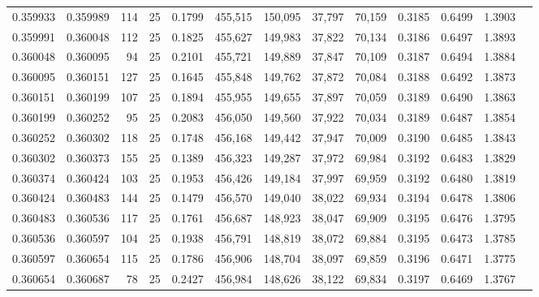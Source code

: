 \begin{tabular}{rrrrrrrrrrrrr}
0.359933 & 0.359989 &   114 &  25 &                                     0.1799 & 455,515 & 150,095 &  37,797 &  70,159 & 0.3185 & 0.6499 & 1.3903 \\
0.359991 & 0.360048 &   112 &  25 &                                     0.1825 & 455,627 & 149,983 &  37,822 &  70,134 & 0.3186 & 0.6497 & 1.3893 \\
0.360048 & 0.360095 &    94 &  25 &                                     0.2101 & 455,721 & 149,889 &  37,847 &  70,109 & 0.3187 & 0.6494 & 1.3884 \\
0.360095 & 0.360151 &   127 &  25 &                                     0.1645 & 455,848 & 149,762 &  37,872 &  70,084 & 0.3188 & 0.6492 & 1.3873 \\
0.360151 & 0.360199 &   107 &  25 &                                     0.1894 & 455,955 & 149,655 &  37,897 &  70,059 & 0.3189 & 0.6490 & 1.3863 \\
0.360199 & 0.360252 &    95 &  25 &                                     0.2083 & 456,050 & 149,560 &  37,922 &  70,034 & 0.3189 & 0.6487 & 1.3854 \\
0.360252 & 0.360302 &   118 &  25 &                                     0.1748 & 456,168 & 149,442 &  37,947 &  70,009 & 0.3190 & 0.6485 & 1.3843 \\
0.360302 & 0.360373 &   155 &  25 &                                     0.1389 & 456,323 & 149,287 &  37,972 &  69,984 & 0.3192 & 0.6483 & 1.3829 \\
0.360374 & 0.360424 &   103 &  25 &                                     0.1953 & 456,426 & 149,184 &  37,997 &  69,959 & 0.3192 & 0.6480 & 1.3819 \\
0.360424 & 0.360483 &   144 &  25 &                                     0.1479 & 456,570 & 149,040 &  38,022 &  69,934 & 0.3194 & 0.6478 & 1.3806 \\
0.360483 & 0.360536 &   117 &  25 &                                     0.1761 & 456,687 & 148,923 &  38,047 &  69,909 & 0.3195 & 0.6476 & 1.3795 \\
0.360536 & 0.360597 &   104 &  25 &                                     0.1938 & 456,791 & 148,819 &  38,072 &  69,884 & 0.3195 & 0.6473 & 1.3785 \\
0.360597 & 0.360654 &   115 &  25 &                                     0.1786 & 456,906 & 148,704 &  38,097 &  69,859 & 0.3196 & 0.6471 & 1.3775 \\
0.360654 & 0.360687 &    78 &  25 &                                     0.2427 & 456,984 & 148,626 &  38,122 &  69,834 & 0.3197 & 0.6469 & 1.3767 \\

\end{tabular}
